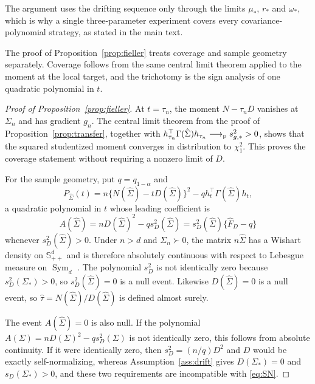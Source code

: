 \documentclass[12pt,a4paper]{article}
\theoremstyle{plain}
\theoremstyle{definition}
\newcommand{\Smat}{\mathbb{S}}
\newcommand{\Sym}{\operatorname{Sym}}
\newcommand{\pto}{\longrightarrow_{\rm p}}
\newcommand{\Sighat}{\hat{\Sigma}}
\newcommand{\FD}{\widehat{F}_D}
\begin{document}
The argument uses the drifting sequence only through the limits $\mu_\ast$, $r_\ast$ and $\omega_\ast$, which is why a single three-parameter experiment covers every covariance-polynomial strategy, as stated in the main text.

The proof of Proposition~\ref{prop:fieller} treats coverage and sample geometry separately.
Coverage follows from the same central limit theorem applied to the moment at the local target, and the trichotomy is the sign analysis of one quadratic polynomial in $t$.

\begin{proof}[Proof of Proposition~\ref{prop:fieller}]
    At $t=\tau_n$, the moment $N-\tau_nD$ vanishes at $\Sigma_n$ and has gradient $g_n$.
    The central limit theorem from the proof of Proposition~\ref{prop:transfer}, together with $h_{\tau_n}^\top\Gamma(\Sighat)h_{\tau_n}\pto s_{g,\ast}^2>0$, shows that the squared studentized moment converges in distribution to $\chi_1^2$.
    This proves the coverage statement without requiring a nonzero limit of $D$.
    
    For the sample geometry, put $q=q_{1-\alpha}$ and
    \begin{equation*}
        P_{\Sighat}(t)
        =
        n\{N(\Sighat)-tD(\Sighat)\}^2
        -q h_t^\top\Gamma(\Sighat)h_t
        ,
    \end{equation*}
    a quadratic polynomial in $t$ whose leading coefficient is
    \begin{equation*}
        A(\Sighat)
        =
        nD(\Sighat)^2-q s_D^2(\Sighat)
        =
        s_D^2(\Sighat)\{\FD-q\}
    \end{equation*}
    whenever $s_D^2(\Sighat)>0$.
    Under $n>d$ and $\Sigma_n\succ0$, the matrix $n\Sighat$ has a Wishart density on $\Smat^d_{++}$ and is therefore absolutely continuous with respect to Lebesgue measure on $\Sym_d$ \citep[Ch.~3]{muirhead1982}.
    The polynomial $s_D^2$ is not identically zero because $s_D^2(\Sigma_\ast)>0$, so $s_D^2(\Sighat)=0$ is a null event.
    Likewise $D(\Sighat)=0$ is a null event, so $\hat{\tau}=N(\Sighat)/D(\Sighat)$ is defined almost surely.
    
    The event $A(\Sighat)=0$ is also null.
    If the polynomial $A(\Sigma)=nD(\Sigma)^2-q s_D^2(\Sigma)$ is not identically zero, this follows from absolute continuity.
    If it were identically zero, then $s_D^2=(n/q)D^2$ and $D$ would be exactly self-normalizing, whereas Assumption~\ref{ass:drift} gives $D(\Sigma_\ast)=0$ and $s_D(\Sigma_\ast)>0$, and these two requirements are incompatible with \eqref{eq:SN}.


\end{proof}
\end{document}
